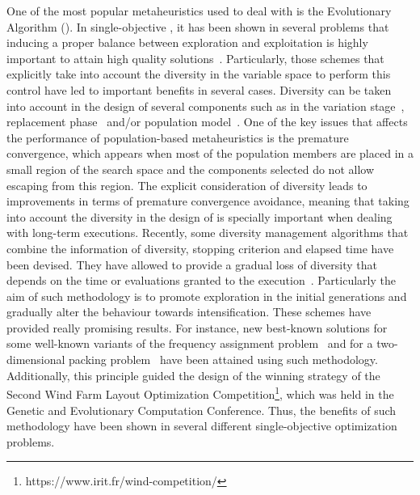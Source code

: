One of the most popular metaheuristics used to deal with \MOPS{} is the Evolutionary Algorithm (\EA{}).
%
In single-objective \EAS{}, it has been shown in several problems that inducing a proper balance between exploration and exploitation is highly important to 
attain high quality solutions~\cite{Joel:BALANCE_DIVERSITY}.
%
Particularly, those schemes that explicitly take into account the diversity in the variable space to perform this control have led to important benefits in several cases.
%
Diversity can be taken into account in the design of several components such as in the variation stage~\cite{Joel:FUZZY_ADAPTIVE_GA,Joel:CROSSOVER_DIVERSITY}, 
replacement phase~\cite{Joel:MULTI_DYNAMIC} and/or population model~\cite{Joel:SAWTOOTH}.
%
One of the key issues that affects the performance of population-based metaheuristics is the premature convergence, which appears
when most of the population members are placed in a small region of the search space and the components selected do not allow escaping from this region.
%
The explicit consideration of diversity leads to improvements in terms of premature convergence avoidance, meaning that taking into account the diversity in the design of \EAS{} is specially important when dealing with long-term executions.
%
Recently, some diversity management algorithms that combine the information of diversity, stopping criterion and elapsed time have been devised.
%
They have allowed to provide a gradual loss of diversity that depends on the time or evaluations granted to the execution~\cite{Joel:MULTI_DYNAMIC}.
%
Particularly the aim of such methodology is to promote exploration in the initial generations and gradually alter the behaviour towards intensification.
%
These schemes have provided really promising results.
%
For instance, new best-known solutions for some well-known variants of the frequency assignment problem~\cite{Segura:17} and for a two-dimensional packing problem~\cite{Joel:MULTI_DYNAMIC} have been attained
using such methodology.
%
Additionally, this principle guided the design of the winning strategy of the Second Wind Farm Layout Optimization Competition\footnote{https://www.irit.fr/wind-competition/}, which was held in the Genetic and Evolutionary 
Computation Conference.
%
Thus, the benefits of such methodology have been shown in several different single-objective optimization problems.

